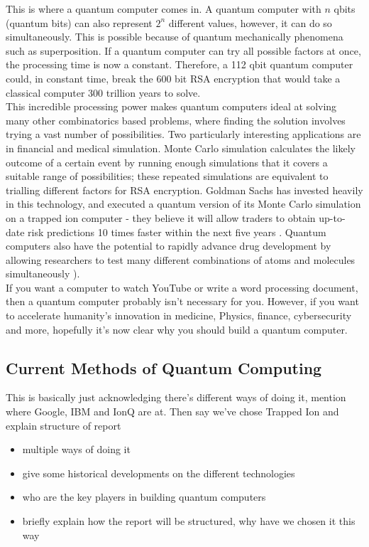 This is where a quantum computer comes in. A quantum computer with $n$ qbits (quantum bits) can also represent $2^n$ different values, however, it can do so simultaneously. This is possible because of quantum mechanically phenomena such as superposition. If a quantum computer can try all possible factors at once, the processing time is now a constant. Therefore, a 112 qbit quantum computer could, in constant time, break the 600 bit RSA encryption that would take a classical computer 300 trillion years to solve.\\

This incredible processing power makes quantum computers ideal at solving many other combinatorics based problems, where finding the solution involves trying a vast number of possibilities. Two particularly interesting applications are in financial and medical simulation. Monte Carlo simulation calculates the likely outcome of a certain event by running enough simulations that it covers a suitable range of possibilities; these repeated simulations are equivalent to trialling different factors for RSA encryption. Goldman Sachs has invested heavily in this technology, and executed a quantum version of its Monte Carlo simulation on a trapped ion computer - they believe it will allow traders to obtain up-to-date risk predictions 10 times faster within the next five years \cite{Giurgica_Tiron_2022}. Quantum computers also have the potential to rapidly advance drug development by allowing researchers to test many different combinations of atoms and molecules simultaneously \cite{bova2021commercial}).\\

If you want a computer to watch YouTube or write a word processing document, then a quantum computer probably isn't necessary for you. However, if you want to accelerate humanity's innovation in medicine, Physics, finance, cybersecurity and more, hopefully it's now clear why you should build a quantum computer.

\subsection{Current Methods of Quantum Computing}
This is basically just acknowledging there's different ways of doing it, mention where Google, IBM and IonQ are at. Then say we've chose Trapped Ion and explain structure of report 
\begin{itemize}
    \item multiple ways of doing it
    \item give some historical developments on the different technologies
    \item who are the key players in building quantum computers
    \item briefly explain how the report will be structured, why have we chosen it this way
\end{itemize}

